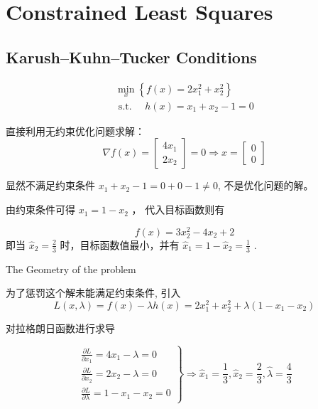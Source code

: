 \chapter{Constrained Least Squares}

\section{Karush–Kuhn–Tucker Conditions}

\begin{problem}
    $$
\begin{array}{l}
\min _{x}\left\{f(x)=2 x_{1}^{2}+x_{2}^{2}\right\} \\
\text { s.t. } \quad h(x)=x_{1}+x_{2}-1=0
\end{array}
$$

直接利用无约束优化问题求解： 
$$ \nabla f(x)=\left[\begin{array}{l}4 x_{1} \\ 2 x_{2}\end{array}\right]=0 \Rightarrow x=\left[\begin{array}{l}0 \\ 0\end{array}\right] $$

显然不满足约束条件 $ x_{1}+x_{2}-1=0+0-1 \neq 0 $, 不是优化问题的解。
\end{problem}

由约束条件可得 $ x_{1}=1-x_{2} $ ， 代入目标函数则有

$$ f(x)=3 x_{2}^{2}-4 x_{2}+2 $$
即当 $ \hat{x}_{2}=\frac{2}{3} $ 时，目标函数值最小，并有 $ \hat{x}_{1}=1-\hat{x}_{2}=\frac{1}{3} $ .

\begin{FigureCenter}{The Geometry of the problem}
    \label{fig:geometry-of-the-problem}
    
\end{FigureCenter}

为了惩罚这个解未能满足约束条件, 引入
$$
L(x, \lambda)=f(x)-\lambda h(x)=2 x_{1}^{2}+x_{2}^{2}+\lambda\left(1-x_{1}-x_{2}\right)
$$

对拉格朗日函数进行求导

$$ \left.\begin{array}{l}\frac{\partial L}{\partial x_{1}}=4 x_{1}-\lambda=0 \\ \frac{\partial L}{\partial x_{2}}=2 x_{2}-\lambda=0 \\ \frac{\partial L}{\partial \lambda}=1-x_{1}-x_{2}=0\end{array}\right \} \Rightarrow \hat{x}_{1}=\frac{1}{3}, \hat{x}_{2}=\frac{2}{3}, \hat{\lambda}=\frac{4}{3} $$

